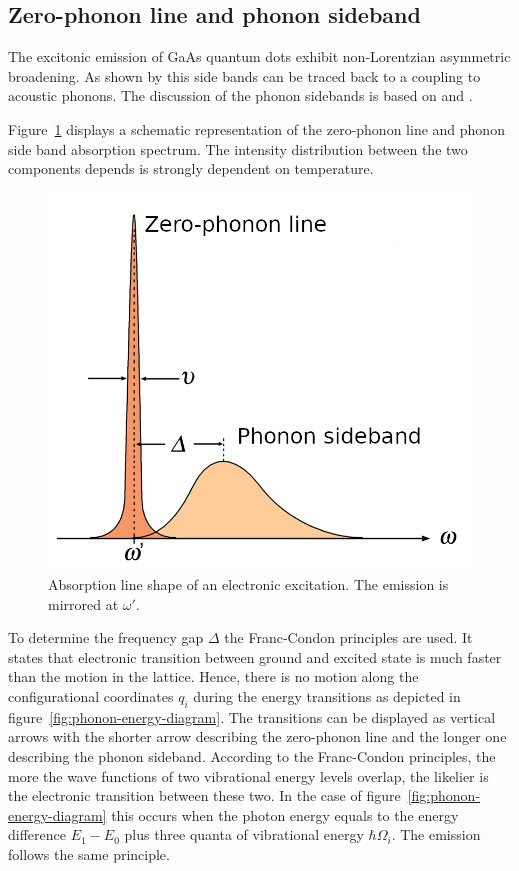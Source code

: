 \subsection{Zero-phonon line and phonon sideband}
The excitonic emission of GaAs quantum dots exhibit non-Lorentzian asymmetric broadening. As shown by \textcite{peter_phonon_2004} this side bands can be traced back to a coupling to acoustic phonons.
The discussion of the phonon sidebands is based on \textcite{friedrich_photochemical_1984} and \textcite{peter_phonon_2004}.

Figure~\ref{fig:line-shape} displays a schematic representation of the zero-phonon line and phonon side band absorption spectrum.
The intensity distribution between the two components depends is strongly dependent on temperature.
\begin{figure}[H]
	\centering
	\includegraphics[width=0.6\linewidth]{figures/quantum-dot/Line-shape}
	\caption[Absorption line shape of an electronic excitation.]{Absorption line shape of an electronic excitation.
	The emission is mirrored at $\omega'$.}
	\label{fig:line-shape}
\end{figure}
To determine the frequency gap $\Delta$ the Franc-Condon principles are used. It states that electronic transition between ground and excited state is much faster than the motion in the lattice.
Hence, there is no motion along the configurational coordinates $q_i$ during the energy transitions as depicted in figure~\ref{fig:phonon-energy-diagram}.
The transitions can be displayed as vertical arrows with the shorter arrow describing the zero-phonon line and the longer one describing the phonon sideband.
According to the Franc-Condon principles, the more the wave functions of two vibrational energy levels overlap, the likelier is the electronic transition between these two.
In the case of figure~\ref{fig:phonon-energy-diagram} this occurs when the photon energy equals to the energy difference $E_1-E_0$ plus three quanta of vibrational energy $\hbar \Omega_i$.
The emission follows the same principle.


